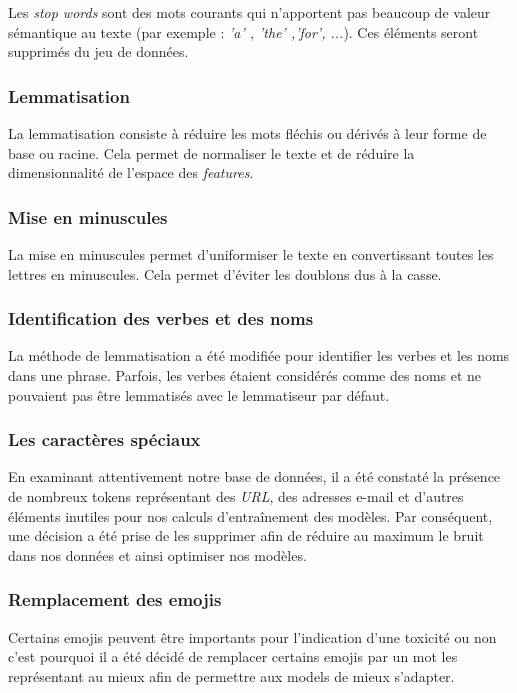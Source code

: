 Les \textit{stop words} sont des mots courants qui n'apportent pas beaucoup de valeur sémantique au texte (par exemple : \textit{'a' , 'the' ,'for', ...}). Ces éléments seront supprimés du jeu de données.

\subsubsection*{Lemmatisation}

La lemmatisation consiste à réduire les mots fléchis ou dérivés à leur forme de base ou racine. Cela permet de normaliser le texte et de réduire la dimensionnalité de l'espace des \textit{features}.
\subsubsection*{Mise en minuscules}

La mise en minuscules permet d'uniformiser le texte en convertissant toutes les lettres en minuscules. Cela permet d'éviter les doublons dus à la casse.

\subsubsection*{Identification des verbes et des noms}

La méthode de lemmatisation a été modifiée pour identifier les verbes et les noms dans une phrase. Parfois, les verbes étaient considérés comme des noms et ne pouvaient pas être lemmatisés avec le lemmatiseur par défaut.

\subsubsection*{Les caractères spéciaux}

En examinant attentivement notre base de données, il a été constaté la présence de nombreux tokens représentant des \textit{URL}, des adresses e-mail et d’autres éléments inutiles pour nos calculs d’entraînement des modèles. 
Par conséquent, une décision a été prise de les supprimer afin de réduire au maximum le bruit dans nos données et ainsi optimiser nos modèles.

\subsubsection*{Remplacement des emojis}

Certains emojis peuvent être importants pour l'indication d'une toxicité ou non c'est pourquoi il a été décidé de remplacer certains emojis par un mot les représentant au mieux afin de permettre aux models de mieux s'adapter.

